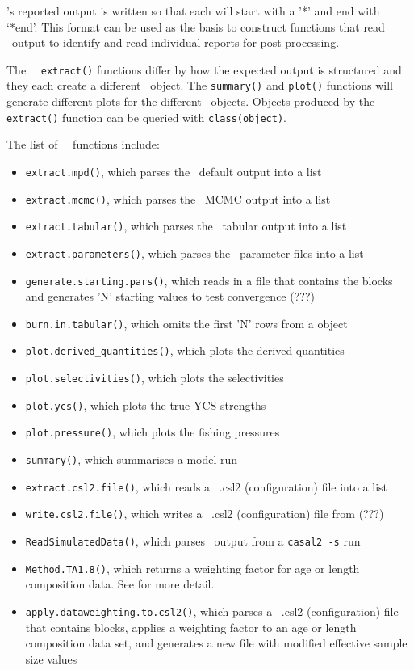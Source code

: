\CNAME's reported output is written so that each  will start with a '*' and end with `*end'. This format can be used as the basis to construct functions that read \CNAME\ output to identify and read individual reports for post-processing.

The \CNAME\ \R\ \texttt{extract()} functions differ by how the expected output is structured and they each create a different \cname\ object. The \texttt{summary()} and \texttt{plot()} functions will generate different plots for the different \cname\ objects. Objects produced by the \texttt{extract()} function can be queried with \texttt{class(object)}.

The list of \cname\ \R\ functions include:

\begin{itemize}
	\item \texttt{extract.mpd()}, which parses the \CNAME\ default output into a list
	\item \texttt{extract.mcmc()}, which parses the \CNAME\ MCMC output into a list
	\item \texttt{extract.tabular()}, which parses the \CNAME\ tabular output into a list
	\item \texttt{extract.parameters()}, which parses the \CNAME\ parameter files into a list
	\item \texttt{generate.starting.pars()}, which reads in a file that contains the  blocks and generates 'N' starting values to test convergence (???)
	\item \texttt{burn.in.tabular()}, which omits the first 'N' rows from a  object
	\item \texttt{plot.derived\_quantities()}, which plots the derived quantities
	\item \texttt{plot.selectivities()}, which plots the selectivities
	\item \texttt{plot.ycs()}, which plots the true YCS strengths
	\item \texttt{plot.pressure()}, which plots the fishing pressures
	\item \texttt{summary()}, which summarises a model run
	\item \texttt{extract.csl2.file()}, which reads a \CNAME\ .csl2 (configuration) file into a list
	\item \texttt{write.csl2.file()}, which writes a \CNAME\ .csl2 (configuration) file from (???)
	\item \texttt{ReadSimulatedData()}, which parses \CNAME\ output from a \texttt{casal2 -s} run
	\item \texttt{Method.TA1.8()}, which returns a weighting factor for age or length composition data. See \cite{francis2011data} for more detail.
	\item \texttt{apply.dataweighting.to.csl2()}, which parses a \CNAME\ .csl2 (configuration) file that contains  blocks, applies a weighting factor to an age or length composition data set, and generates a new  file with modified effective sample size values
\end{itemize}

